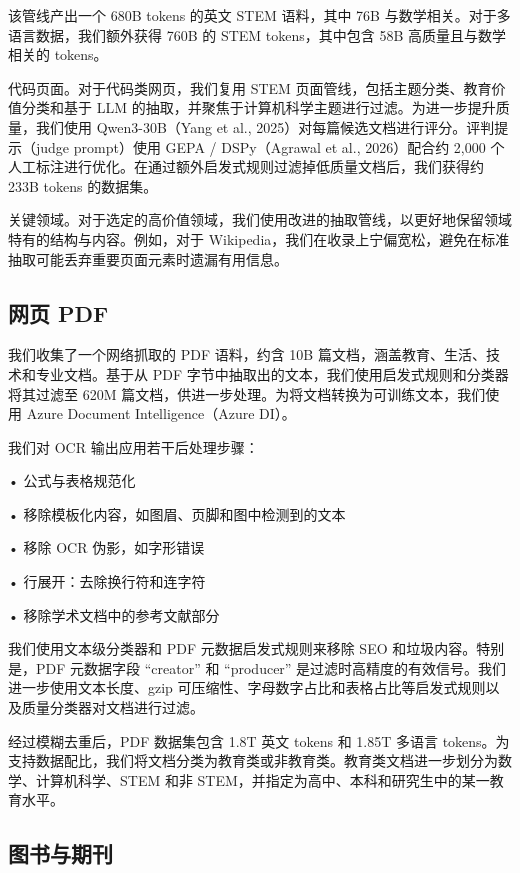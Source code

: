 \documentclass[
  10
]{article}
\begin{document}
该管线产出一个 680B tokens 的英文 STEM 语料，其中 76B 与数学相关。对于多语言数据，我们额外获得 760B 的 STEM tokens，其中包含 58B 高质量且与数学相关的 tokens。

代码页面。对于代码类网页，我们复用 STEM 页面管线，包括主题分类、教育价值分类和基于 LLM 的抽取，并聚焦于计算机科学主题进行过滤。为进一步提升质量，我们使用 Qwen3-30B（Yang et al., 2025）对每篇候选文档进行评分。评判提示（judge prompt）使用 GEPA / DSPy（Agrawal et al., 2026）配合约 2,000 个人工标注进行优化。在通过额外启发式规则过滤掉低质量文档后，我们获得约 233B tokens 的数据集。

关键领域。对于选定的高价值领域，我们使用改进的抽取管线，以更好地保留领域特有的结构与内容。例如，对于 Wikipedia，我们在收录上宁偏宽松，避免在标准抽取可能丢弃重要页面元素时遗漏有用信息。

\subsection{网页 PDF}\label{b.2-web-pdfs}

我们收集了一个网络抓取的 PDF 语料，约含 10B 篇文档，涵盖教育、生活、技术和专业文档。基于从 PDF 字节中抽取出的文本，我们使用启发式规则和分类器将其过滤至 620M 篇文档，供进一步处理。为将文档转换为可训练文本，我们使用 Azure Document Intelligence（Azure DI）。

我们对 OCR 输出应用若干后处理步骤：

• 公式与表格规范化

• 移除模板化内容，如图眉、页脚和图中检测到的文本

• 移除 OCR 伪影，如字形错误

• 行展开：去除换行符和连字符

• 移除学术文档中的参考文献部分

我们使用文本级分类器和 PDF 元数据启发式规则来移除 SEO 和垃圾内容。特别是，PDF 元数据字段 ``creator'' 和 ``producer'' 是过滤时高精度的有效信号。我们进一步使用文本长度、gzip 可压缩性、字母数字占比和表格占比等启发式规则以及质量分类器对文档进行过滤。

经过模糊去重后，PDF 数据集包含 1.8T 英文 tokens 和 1.85T 多语言 tokens。为支持数据配比，我们将文档分类为教育类或非教育类。教育类文档进一步划分为数学、计算机科学、STEM 和非 STEM，并指定为高中、本科和研究生中的某一教育水平。

\subsection{图书与期刊}\label{b.3-books-and-journals}
\end{document}

